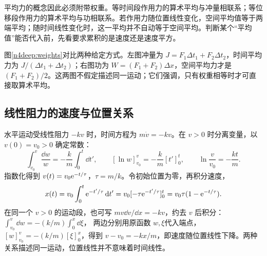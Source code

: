 平均力的概念因此必须附带权重。等时间段作用力的算术平均与冲量相联系；等位移段作用力的算术平均与功相联系。若作用力随位置线性变化，空间平均值等于两端平均；随时间线性变化时，这一平均并不自动等于空间平均。判断某个“平均值”能否代入前，先看要求累积的是速度还是速度平方。

图\ref{n4deep:weights}对比两种给定方式。左图冲量为 $J=F_1\Delta t_1+F_2\Delta t_2$，时间平均力为 $J/(\Delta t_1+\Delta t_2)$；右图功为 $W=(F_1+F_2)\Delta x$，空间平均力才是 $(F_1+F_2)/2$。这两图不假定描述同一运动；它们强调，只有权重相等时才可直接取算术平均。

\subsection{线性阻力的速度与位置关系}
水平运动受线性阻力 $-kv$ 时，时间方程为 $m\dot v=-kv$。在 $v>0$ 时分离变量，以 $v(0)=v_0>0$ 确定常数：
\[
\int_{v_0}^{v}\frac{\dd w}{w}=-\frac km\int_0^t\dd t',
\qquad
[\ln w]_{v_0}^{v}=-\frac km[t']_0^t,
\qquad
\ln\frac{v}{v_0}=-\frac{kt}{m}.
\]
指数化得到 $v(t)=v_0\mathrm e^{-t/\tau}$，$\tau=m/k$。令初始位置为零，再积分速度，
\[
x(t)=v_0\int_0^t\mathrm e^{-t'/\tau}\mathop{}\!\mathrm d t'
=v_0[-\tau\mathrm e^{-t'/\tau}]_0^t
=v_0\tau(1-\mathrm e^{-t/\tau}).
\]
在同一个 $v>0$ 的运动段，也可写 $mv\dd v/\dd x=-kv$，约去 $v$ 后积分：
$\int_{v_0}^v\dd w=-(k/m)\int_0^x\dd\xi$，
两边分别用原函数 $w,\xi$代入端点，$[w]_{v_0}^v=-(k/m)[\xi]_0^x$，得到 $v-v_0=-kx/m$，即速度随位置线性下降。两种关系描述同一运动，位置线性并不意味着时间线性。

